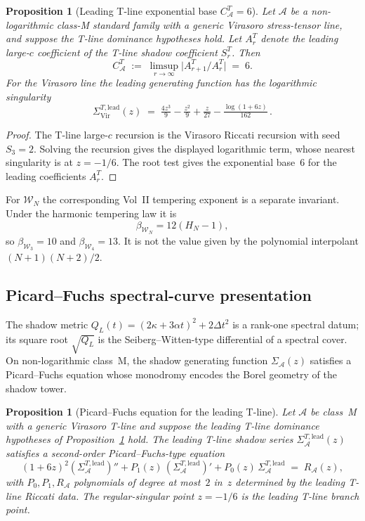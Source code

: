 \documentclass[11pt]{article}
\theoremstyle{plain}
\newtheorem{proposition}[theorem]{Proposition}
\theoremstyle{definition}
\theoremstyle{remark}
\providecommand{\cA}{\mathcal{A}}
\providecommand{\cW}{\mathcal{W}}
\providecommand{\Vir}{\mathrm{Vir}}
\begin{document}
\begin{proposition}[Leading T-line exponential base $C^T_\cA = 6$]
\label{thm:universal-C-A-6-sa}
Let $\cA$ be a non-logarithmic class-M standard family with a
generic Virasoro stress-tensor line, and suppose the T-line
dominance hypotheses hold. Let $A_r^T$ denote the leading
large-$c$ coefficient of the T-line shadow coefficient $S_r^T$.
Then
\[
C^T_\cA \;:=\; \limsup_{r \to \infty}
\bigl|A_{r+1}^T/A_r^T\bigr| \;=\; 6.
\]
For the Virasoro line the leading generating function has the
logarithmic singularity
\[
\Sigma_{\Vir}^{T,\mathrm{lead}}(z)
\;=\;
\tfrac{4z^3}{9} - \tfrac{z^2}{9} + \tfrac{z}{27}
 - \tfrac{\log(1 + 6z)}{162}\,.
\]
\end{proposition}

\begin{proof}
The T-line large-$c$ recursion is the Virasoro Riccati recursion
with seed $S_3=2$. Solving the recursion gives the displayed
logarithmic term, whose nearest singularity is at $z=-1/6$.
The root test gives the exponential base~$6$ for the leading
coefficients $A_r^T$.
\end{proof}

For $\cW_N$ the corresponding Vol~II tempering exponent is a
separate invariant. Under the harmonic tempering law it is
\[
\beta_{\cW_N}=12(H_N-1),
\]
so $\beta_{\cW_3}=10$ and $\beta_{\cW_4}=13$. It is not the
value given by the polynomial interpolant $(N+1)(N+2)/2$.

\subsection{Picard--Fuchs spectral-curve presentation}
\label{ssec:picard-fuchs-spectral-curve}

The shadow metric $Q_L(t) = (2\kappa + 3\alpha t)^2 + 2\Delta
t^2$ is a rank-one spectral datum; its square root $\sqrt{Q_L}$
is the Seiberg--Witten-type differential of a spectral cover. On
non-logarithmic class~M, the shadow generating function
$\Sigma_\cA(z)$ satisfies a Picard--Fuchs equation whose
monodromy encodes the Borel geometry of the shadow tower.

\begin{proposition}[Picard--Fuchs equation for the leading T-line]
\label{prop:picard-fuchs-sa}
Let $\cA$ be class~M with a generic Virasoro T-line and suppose the
leading T-line dominance hypotheses of
Proposition~\ref{thm:universal-C-A-6-sa} hold. The leading T-line
shadow series $\Sigma_\cA^{T,\mathrm{lead}}(z)$ satisfies a
second-order Picard--Fuchs-type equation
\[
(1 + 6z)^2 (\Sigma_\cA^{T,\mathrm{lead}})''
 + P_1(z)\, (\Sigma_\cA^{T,\mathrm{lead}})'
 + P_0(z)\, \Sigma_\cA^{T,\mathrm{lead}}
\;=\; R_\cA(z),
\]
with $P_0, P_1, R_\cA$ polynomials of degree at most~$2$ in~$z$
determined by the leading T-line Riccati data. The regular-singular
point $z=-1/6$ is the leading T-line branch point.
\end{proposition}
\end{document}
